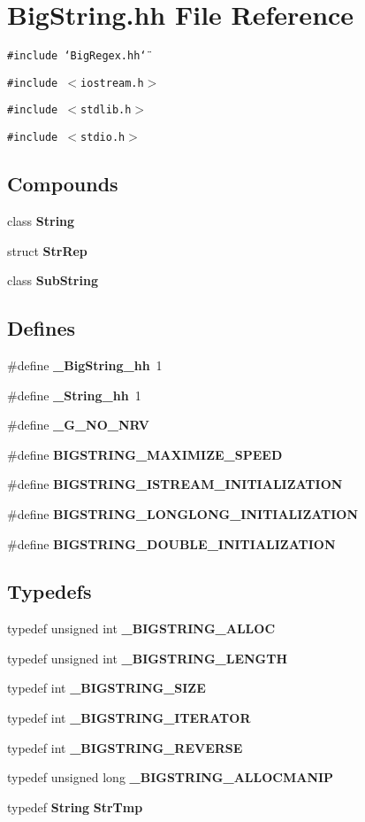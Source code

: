 \section{Big\-String.hh File Reference}
\label{BigString_8hh}
{\tt \#include \char`\"{}Big\-Regex.hh\char`\"{}}\par
{\tt \#include $<$iostream.h$>$}\par
{\tt \#include $<$stdlib.h$>$}\par
{\tt \#include $<$stdio.h$>$}\par
\subsection*{Compounds}
\begin{CompactItemize}
\item 
class {\bf String}
\item 
struct {\bf Str\-Rep}
\item 
class {\bf Sub\-String}
\end{CompactItemize}
\subsection*{Defines}
\begin{CompactItemize}
\item 
\#define {\bf \_\-Big\-String\_\-hh}\ 1
\item 
\#define {\bf \_\-String\_\-hh}\ 1
\item 
\#define {\bf \_\-G\_\-NO\_\-NRV}
\item 
\#define {\bf BIGSTRING\_\-MAXIMIZE\_\-SPEED}
\item 
\#define {\bf BIGSTRING\_\-ISTREAM\_\-INITIALIZATION}
\item 
\#define {\bf BIGSTRING\_\-LONGLONG\_\-INITIALIZATION}
\item 
\#define {\bf BIGSTRING\_\-DOUBLE\_\-INITIALIZATION}
\end{CompactItemize}
\subsection*{Typedefs}
\begin{CompactItemize}
\item 
typedef unsigned int {\bf \_\-BIGSTRING\_\-ALLOC}
\item 
typedef unsigned int {\bf \_\-BIGSTRING\_\-LENGTH}
\item 
typedef int {\bf \_\-BIGSTRING\_\-SIZE}
\item 
typedef int {\bf \_\-BIGSTRING\_\-ITERATOR}
\item 
typedef int {\bf \_\-BIGSTRING\_\-REVERSE}
\item 
typedef unsigned long {\bf \_\-BIGSTRING\_\-ALLOCMANIP}
\item 
typedef {\bf String} {\bf Str\-Tmp}
\end{CompactItemize}
